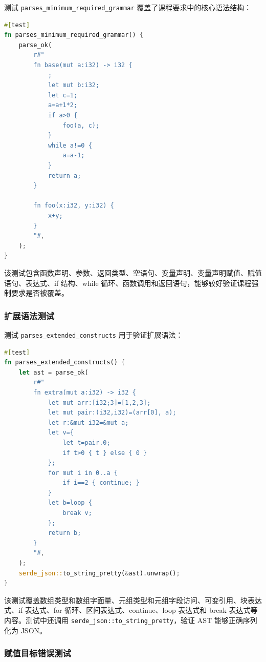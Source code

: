 \documentclass[UTF8,a4paper,12pt]{ctexart}
\begin{document}
测试 \texttt{parses\_minimum\_required\_grammar} 覆盖了课程要求中的核心语法结构：

\begin{lstlisting}[language=Rust,caption={最低语法规则测试示例}]
#[test]
fn parses_minimum_required_grammar() {
    parse_ok(
        r#"
        fn base(mut a:i32) -> i32 {
            ;
            let mut b:i32;
            let c=1;
            a=a+1*2;
            if a>0 {
                foo(a, c);
            }
            while a!=0 {
                a=a-1;
            }
            return a;
        }

        fn foo(x:i32, y:i32) {
            x+y;
        }
        "#,
    );
}
\end{lstlisting}

该测试包含函数声明、参数、返回类型、空语句、变量声明、变量声明赋值、赋值语句、表达式、if 结构、while 循环、函数调用和返回语句，能够较好验证课程强制要求是否被覆盖。

\subsubsection{扩展语法测试}

测试 \texttt{parses\_extended\_constructs} 用于验证扩展语法：

\begin{lstlisting}[language=Rust,caption={扩展语法测试示例}]
#[test]
fn parses_extended_constructs() {
    let ast = parse_ok(
        r#"
        fn extra(mut a:i32) -> i32 {
            let mut arr:[i32;3]=[1,2,3];
            let mut pair:(i32,i32)=(arr[0], a);
            let r:&mut i32=&mut a;
            let v={
                let t=pair.0;
                if t>0 { t } else { 0 }
            };
            for mut i in 0..a {
                if i==2 { continue; }
            }
            let b=loop {
                break v;
            };
            return b;
        }
        "#,
    );
    serde_json::to_string_pretty(&ast).unwrap();
}
\end{lstlisting}

该测试覆盖数组类型和数组字面量、元组类型和元组字段访问、可变引用、块表达式、if 表达式、for 循环、区间表达式、continue、loop 表达式和 break 表达式等内容。测试中还调用 \texttt{serde\_json::to\_string\_pretty}，验证 AST 能够正确序列化为 JSON。

\subsubsection{赋值目标错误测试}
\end{document}
